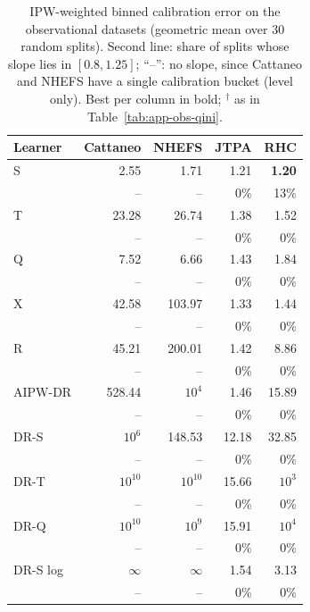 \documentclass{article}
\begin{document}
\begin{table}[H]
\centering
\caption{IPW-weighted binned calibration error on the observational datasets
(geometric mean over $30$ random splits). Second line: share of splits whose
slope lies in $[0.8, 1.25]$; ``--'': no slope, since Cattaneo and NHEFS have a
single calibration bucket (level only). Best per column in bold; $^\dagger$ as
in Table~\ref{tab:app-obs-qini}.}
\label{tab:app-obs-cal}
\footnotesize
\setlength{\tabcolsep}{3pt}
\begin{tabular}{l|rrrr}
\hline
Learner & Cattaneo & NHEFS & JTPA & RHC \\
\hline
S & 2.55 & 1.71 & 1.21 & \textbf{1.20} \\
 & \scriptsize -- & \scriptsize -- & \scriptsize 0\% & \scriptsize 13\% \\[2pt]
T & 23.28 & 26.74 & 1.38 & 1.52 \\
 & \scriptsize -- & \scriptsize -- & \scriptsize 0\% & \scriptsize 0\% \\[2pt]
\hline
Q & 7.52 & 6.66 & 1.43 & 1.84 \\
 & \scriptsize -- & \scriptsize -- & \scriptsize 0\% & \scriptsize 0\% \\[2pt]
\hline
X & 42.58 & 103.97 & 1.33 & 1.44 \\
 & \scriptsize -- & \scriptsize -- & \scriptsize 0\% & \scriptsize 0\% \\[2pt]
R & 45.21 & 200.01 & 1.42 & 8.86 \\
 & \scriptsize -- & \scriptsize -- & \scriptsize 0\% & \scriptsize 0\% \\[2pt]
AIPW-DR & 528.44 & $10^{4}$ & 1.46 & 15.89 \\
 & \scriptsize -- & \scriptsize -- & \scriptsize 0\% & \scriptsize 0\% \\[2pt]
\hline
DR-S & $10^{6}$ & 148.53 & 12.18 & 32.85 \\
 & \scriptsize -- & \scriptsize -- & \scriptsize 0\% & \scriptsize 0\% \\[2pt]
DR-T & $10^{10}$ & $10^{10}$ & 15.66 & $10^{3}$ \\
 & \scriptsize -- & \scriptsize -- & \scriptsize 0\% & \scriptsize 0\% \\[2pt]
DR-Q & $10^{10}$ & $10^{9}$ & 15.91 & $10^{4}$ \\
 & \scriptsize -- & \scriptsize -- & \scriptsize 0\% & \scriptsize 0\% \\[2pt]
\hline
DR-S log & $\infty$ & $\infty$ & 1.54 & 3.13 \\
 & \scriptsize -- & \scriptsize -- & \scriptsize 0\% & \scriptsize 0\% \\[2pt]

\end{tabular}
\end{table}
\end{document}
